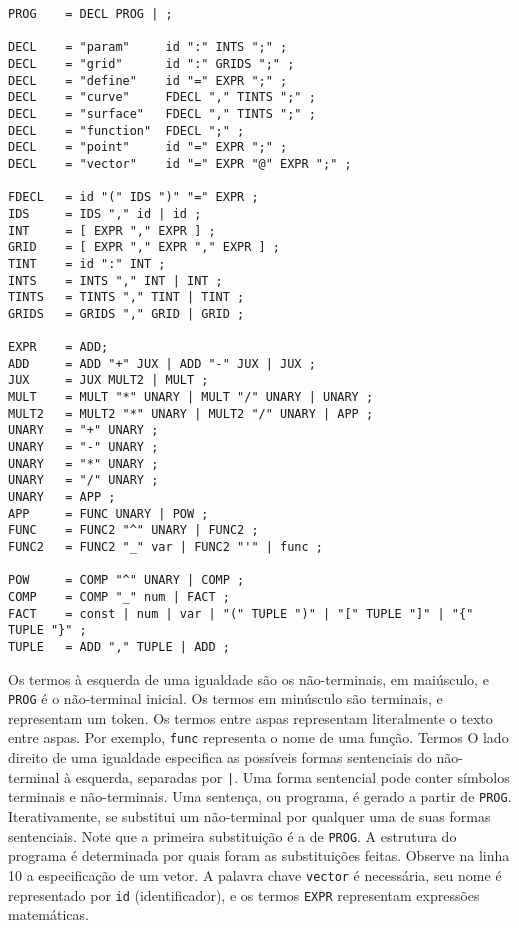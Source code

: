 \newpage
\begin{lstlisting}[caption=Gramática livre de contexto,label=gram]
PROG    = DECL PROG | ;

DECL    = "param"     id ":" INTS ";" ;
DECL    = "grid"      id ":" GRIDS ";" ;
DECL    = "define"    id "=" EXPR ";" ;
DECL    = "curve"     FDECL "," TINTS ";" ;
DECL    = "surface"   FDECL "," TINTS ";" ;
DECL    = "function"  FDECL ";" ;
DECL    = "point"     id "=" EXPR ";" ;
DECL    = "vector"    id "=" EXPR "@" EXPR ";" ;

FDECL   = id "(" IDS ")" "=" EXPR ;
IDS     = IDS "," id | id ;
INT     = [ EXPR "," EXPR ] ;
GRID    = [ EXPR "," EXPR "," EXPR ] ;
TINT    = id ":" INT ;
INTS    = INTS "," INT | INT ;
TINTS   = TINTS "," TINT | TINT ;
GRIDS   = GRIDS "," GRID | GRID ;

EXPR    = ADD;
ADD     = ADD "+" JUX | ADD "-" JUX | JUX ;
JUX     = JUX MULT2 | MULT ;
MULT    = MULT "*" UNARY | MULT "/" UNARY | UNARY ;
MULT2   = MULT2 "*" UNARY | MULT2 "/" UNARY | APP ;
UNARY   = "+" UNARY ;
UNARY   = "-" UNARY ;
UNARY   = "*" UNARY ;
UNARY   = "/" UNARY ;
UNARY   = APP ;
APP     = FUNC UNARY | POW ;
FUNC    = FUNC2 "^" UNARY | FUNC2 ;
FUNC2   = FUNC2 "_" var | FUNC2 "'" | func ;

POW     = COMP "^" UNARY | COMP ;
COMP    = COMP "_" num | FACT ;
FACT    = const | num | var | "(" TUPLE ")" | "[" TUPLE "]" | "{" TUPLE "}" ;
TUPLE   = ADD "," TUPLE | ADD ;
\end{lstlisting}

Os termos à esquerda de uma igualdade são os não-terminais, em maiúsculo, e \texttt{PROG} é o não-terminal inicial.
Os termos em minúsculo são terminais, e representam um token.
Os termos entre aspas representam literalmente o texto entre aspas.
Por exemplo, \texttt{func} representa o nome de uma função. Termos
O lado direito de uma igualdade especifica as possíveis formas sentenciais do 
não-terminal à esquerda, separadas por \texttt{|}.
Uma forma sentencial pode conter símbolos terminais e não-terminais.
Uma sentença, ou programa, é gerado a partir de \texttt{PROG}.
Iterativamente, se substitui um não-terminal por qualquer uma de suas formas sentenciais. 
Note que a primeira substituição é a de \texttt{PROG}.
A estrutura do programa é determinada por quais foram as substituições feitas.
Observe na linha 10 a especificação de um vetor. A palavra chave \texttt{vector} é necessária, seu nome é representado por \texttt{id} (identificador),
e os termos \texttt{EXPR} representam expressões matemáticas.

